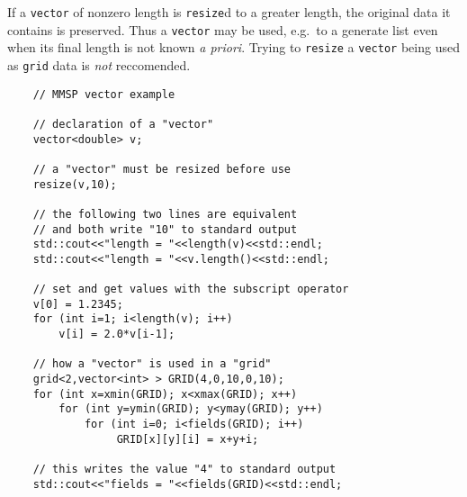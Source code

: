 If a {\tt vector} of nonzero length is {\tt resize}d to a greater length, the original data it contains is preserved.  Thus a {\tt vector} may be used, e.g.\ to a generate list even when its final length is not known {\em a priori}.  Trying to {\tt resize} a {\tt vector} being used as {\tt grid} data is {\em not} reccomended.
\begin{shadebox}
\begin{verbatim}
    // MMSP vector example

    // declaration of a "vector"
    vector<double> v;

    // a "vector" must be resized before use
    resize(v,10);

    // the following two lines are equivalent
    // and both write "10" to standard output
    std::cout<<"length = "<<length(v)<<std::endl;
    std::cout<<"length = "<<v.length()<<std::endl;

    // set and get values with the subscript operator
    v[0] = 1.2345;
    for (int i=1; i<length(v); i++)
        v[i] = 2.0*v[i-1];

    // how a "vector" is used in a "grid"
    grid<2,vector<int> > GRID(4,0,10,0,10);
    for (int x=xmin(GRID); x<xmax(GRID); x++)
        for (int y=ymin(GRID); y<ymay(GRID); y++)
            for (int i=0; i<fields(GRID); i++)
                 GRID[x][y][i] = x+y+i;
    
    // this writes the value "4" to standard output
    std::cout<<"fields = "<<fields(GRID)<<std::endl;
\end{verbatim}
\end{shadebox}
\hfill
\pagebreak

